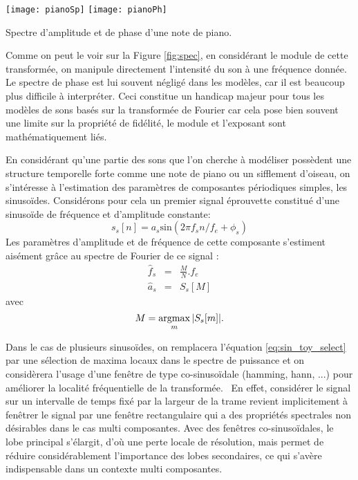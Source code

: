 \begin{marginfigure}
  \texttt{[image: pianoSp]}
  \texttt{[image: pianoPh]}
  \caption{Spectre d'amplitude et de phase d'une note de piano.}
  \label{fig:spec}
\end{marginfigure}

Comme on peut le voir sur la Figure \ref{fig:spec}, en considérant le module de cette transformée, on manipule directement l'intensité du son à une fréquence donnée. Le spectre de phase est lui souvent négligé dans les modèles, car il est beaucoup plus difficile à interpréter. Ceci constitue un handicap majeur pour tous les modèles de sons basés sur la transformée de Fourier car cela pose bien souvent une limite sur la propriété de fidélité, le module et l'exposant sont mathématiquement liés.


En considérant qu'une partie des sons que l'on cherche à modéliser possèdent une structure temporelle forte comme une note de piano ou un sifflement d'oiseau, on s'intéresse à l'estimation des paramètres de composantes périodiques simples, les sinusoïdes. Considérons pour cela un premier signal \og éprouvette \fg constitué d'une sinusoïde de fréquence et d'amplitude constante:
\begin{equation}
  s_s[n] = a_s \mathrm{sin}(2\pi f_s n /f_e + \phi_s)
  \label{eq:sin_toy}
\end{equation}
Les paramètres d'amplitude et de fréquence de cette composante s'estiment aisément grâce au spectre de Fourier de ce signal :
\begin{eqnarray}
  \hat{f}_s &=&  \frac{M}{N} . f_e\\
  \hat{a}_s &=& S_s[M]
    \label{eq:sin_toy_est}
\end{eqnarray}
avec
\begin{equation}
  M = \operatorname*{argmax}_m | S_s[m] |.
  \label{eq:sin_toy_select}
\end{equation}

Dans le cas de plusieurs sinusoïdes, on remplacera l'équation \ref{eq:sin_toy_select} par une sélection de maxima locaux dans le spectre de puissance et on considèrera l'usage d'une fenêtre de type co-sinusoïdale (hamming, hann, ...) pour améliorer la localité fréquentielle de la transformée.~\cite{harris1978use} En effet, considérer le signal sur un intervalle de temps fixé par la largeur de la trame revient implicitement à fenêtrer le signal par une fenêtre rectangulaire qui a des propriétés spectrales non désirables dans le cas multi composantes. Avec des fenêtres co-sinusoïdales, le lobe principal s'élargit, d'où une perte locale de résolution, mais permet de réduire considérablement l'importance des lobes secondaires, ce qui s'avère indispensable dans un contexte multi composantes.

